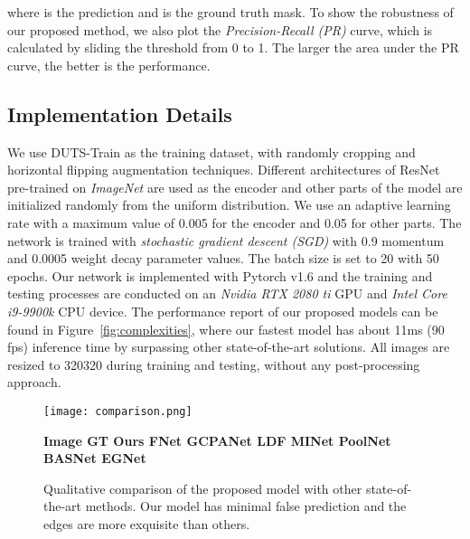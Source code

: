 \documentclass[10pt,twocolumn,letterpaper]{article}
\begin{document}
where  is the prediction and  is the ground truth mask. To show the robustness of our proposed method, we also plot the \textit{Precision-Recall (PR)} curve, which is calculated by sliding the threshold from 0 to 1. The larger the area under the PR curve, the better is the performance.

\subsection{Implementation Details}
We use DUTS-Train as the training dataset, with randomly cropping and horizontal flipping augmentation techniques. Different architectures of ResNet \cite{ResNet} pre-trained on \textit{ImageNet} are used as the encoder and other parts of the model are initialized randomly from the uniform distribution. We use an adaptive learning rate with a maximum value of 0.005 for the encoder and 0.05 for other parts. The network is trained with \textit{stochastic gradient descent (SGD)} with 0.9 momentum and 0.0005 weight decay parameter values. The batch size is set to 20 with 50 epochs. Our network is implemented with Pytorch v1.6 and the training and testing processes are conducted on an \textit{Nvidia RTX 2080 ti} GPU and \textit{Intel Core i9-9900k} CPU
device. The performance report of our proposed models can be found in Figure~\ref{fig:complexities}, where our fastest model has about 11ms (90 fps) inference time by surpassing other state-of-the-art solutions. All images are resized to 320320 during training and testing, without any post-processing approach.

\begin{figure*}[t]
\begin{center}
\texttt{[image: comparison.png]}
\end{center}
\vspace{-10pt}
\textbf{\hspace{0.4cm} Image \hspace{0.8cm} GT \hspace{1cm} Ours \hspace{0.7cm} FNet \hspace{0.3cm} GCPANet \hspace{0.5cm} LDF \hspace{0.7cm} MINet \hspace{0.5cm} PoolNet \hspace{0.4cm} BASNet \hspace{0.4cm} EGNet}
\vspace{6pt}
   \caption{Qualitative comparison of the proposed model with other state-of-the-art methods. Our model has minimal false prediction and the edges are more exquisite than others.}
\label{fig:vis_comparison}
\end{figure*}
\end{document}
